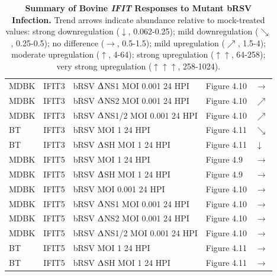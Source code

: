 \begin{table}
\begin{tabular}{lllll}
        MDBK & IFIT3 & bRSV $\Updelta$NS1 MOI 0.001 24 HPI & Figure 4.10 & \(\rightarrow\) \\ 
        MDBK & IFIT3 & bRSV $\Updelta$NS2 MOI 0.001 24 HPI & Figure 4.10 & \(\nearrow\) \\ 
        MDBK & IFIT3 & bRSV $\Updelta$NS1/2 MOI 0.001 24 HPI & Figure 4.10 & \(\nearrow\) \\ 
        BT & IFIT3 & bRSV MOI 1 24 HPI & Figure 4.11 & \(\searrow\) \\ 
        BT & IFIT3 & bRSV $\Updelta$SH MOI 1 24 HPI & Figure 4.11 & \(\downarrow\) \\ 
        MDBK & IFIT5 & bRSV MOI 1 24 HPI & Figure 4.9 & \(\rightarrow\) \\ 
        MDBK & IFIT5 & bRSV $\Updelta$SH MOI 1 24 HPI & Figure 4.9 & \(\rightarrow\) \\ 
        MDBK & IFIT5 & bRSV MOI 0.001 24 HPI & Figure 4.10 & \(\rightarrow\) \\ 
        MDBK & IFIT5 & bRSV $\Updelta$NS1 MOI 0.001 24 HPI & Figure 4.10 & \(\rightarrow\) \\ 
        MDBK & IFIT5 & bRSV $\Updelta$NS2 MOI 0.001 24 HPI & Figure 4.10 & \(\rightarrow\) \\ 
        MDBK & IFIT5 & bRSV $\Updelta$NS1/2 MOI 0.001 24 HPI & Figure 4.10 & \(\rightarrow\) \\ 
        BT & IFIT5 & bRSV MOI 1 24 HPI & Figure 4.11 & \(\rightarrow\) \\ 
        BT & IFIT5 & bRSV $\Updelta$SH MOI 1 24 HPI & Figure 4.11 & \(\rightarrow\) \\ \hline
    \end{tabular}
	\caption[Summary of Bovine \textit{IFIT} Responses to Mutant bRSV Infection.]{\textbf{Summary of Bovine \textit{IFIT} Responses to Mutant bRSV Infection.} Trend arrows indicate abundance relative to mock-treated values: strong downregulation ($\downarrow$, 0.062-0.25); mild downregulation ($\searrow$, 0.25-0.5); no difference ($\rightarrow$, 0.5-1.5); mild upregulation ($\nearrow$, 1.5-4); moderate upregulation ($\uparrow$, 4-64); strong upregulation ($\uparrow\uparrow$, 64-258); very strong upregulation ($\uparrow\uparrow\uparrow$, 258-1024).}
    \label{tab:Summary of Bovine IFIT Responses to Mutant bRSV Infection.}
\end{table}

